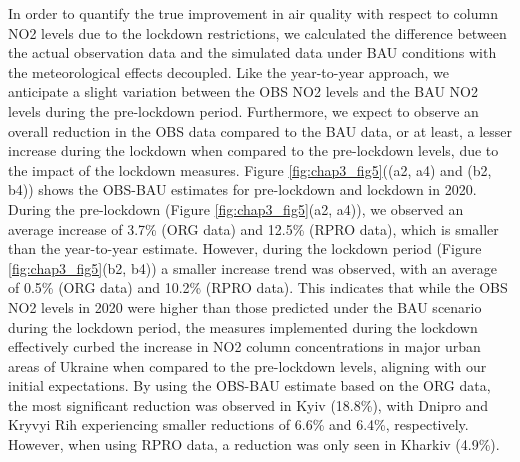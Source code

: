 In order to quantify the true improvement in air quality with respect to column NO2 levels due to the lockdown restrictions, we calculated the difference between the actual observation data and the simulated data under BAU conditions with the meteorological effects decoupled. Like the year-to-year approach, we anticipate a slight variation between the OBS NO2 levels and the BAU NO2 levels during the pre-lockdown period. Furthermore, we expect to observe an overall reduction in the OBS data compared to the BAU data, or at least, a lesser increase during the lockdown when compared to the pre-lockdown levels, due to the impact of the lockdown measures. Figure \ref{fig:chap3_fig5}((a2, a4) and (b2, b4)) shows the OBS-BAU estimates for pre-lockdown and lockdown in 2020. During the pre-lockdown (Figure \ref{fig:chap3_fig5}(a2, a4)), we observed an average increase of 3.7\% (ORG data) and 12.5\% (RPRO data), which is smaller than the year-to-year estimate. However, during the lockdown period (Figure \ref{fig:chap3_fig5}(b2, b4)) a smaller increase trend was observed, with an average of 0.5\% (ORG data) and 10.2\% (RPRO data). This indicates that while the OBS NO2 levels in 2020 were higher than those predicted under the BAU scenario during the lockdown period, the measures implemented during the lockdown effectively curbed the increase in NO2 column concentrations in major urban areas of Ukraine when compared to the pre-lockdown levels, aligning with our initial expectations. By using the OBS-BAU estimate based on the ORG data, the most significant reduction was observed in Kyiv (18.8\%), with Dnipro and Kryvyi Rih experiencing smaller reductions of 6.6\% and 6.4\%, respectively. However, when using RPRO data, a reduction was only seen in Kharkiv (4.9\%).\par

